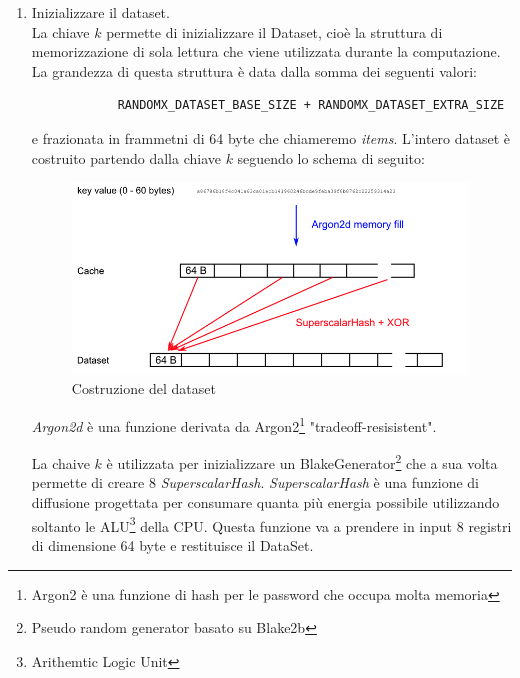 \documentclass[12pt,a4paper]{article}
\begin{document}
\begin{enumerate}
    \item Inizializzare il dataset.\\
        La chiave $k$ permette di inizializzare il Dataset, cioè la struttura di
        memorizzazione di sola lettura che viene utilizzata durante la
        computazione. La grandezza di questa struttura è data dalla somma dei
        seguenti valori:

        \begin{verbatim}
            RANDOMX_DATASET_BASE_SIZE + RANDOMX_DATASET_EXTRA_SIZE
        \end{verbatim}

        e frazionata in frammetni di 64 byte che chiameremo \textit{items}.
        L'intero dataset è costruito partendo dalla chiave $k$ seguendo lo
        schema di seguito:

        \begin{figure}[ht]
            \centering
            \includegraphics[width=0.99\textwidth]{./images/dataset_construction.png}
            \caption{Costruzione del dataset}
            \label{fig:data_construction}
        \end{figure}

        \textit{Argon2d} è una funzione derivata da Argon2\footnote{Argon2 è una
        funzione di hash per le password che occupa molta memoria}
        "tradeoff-resisistent".

        La chaive $k$ è utilizzata per inizializzare un
        BlakeGenerator\footnote{Pseudo random generator basato su Blake2b} che a
        sua volta permette di creare 8 \textit{SuperscalarHash}.
        \textit{SuperscalarHash} è una funzione di diffusione progettata per
        consumare quanta più energia possibile utilizzando soltanto le
        ALU\footnote{Arithemtic Logic Unit} della CPU. Questa funzione va a
        prendere in input 8 registri di dimensione 64 byte e restituisce il
        DataSet.


\end{enumerate}
\end{document}
